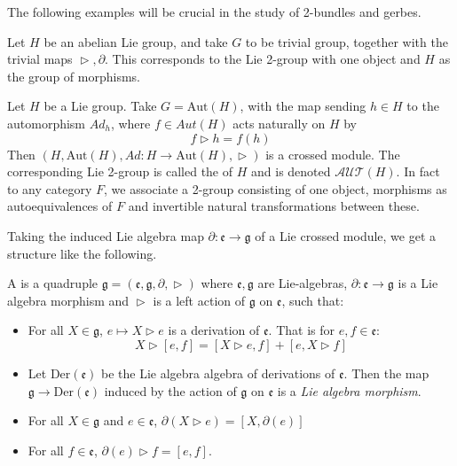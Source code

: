 The following examples will be crucial in the study of 2-bundles and gerbes.
\begin{example} \label{abgerb}
 Let $H$ be an abelian Lie group, and take $G$ to be trivial group, together with the trivial maps $\vartriangleright,\partial$. This corresponds to the Lie 2-group with one object and $H$ as the group of morphisms.
\end{example}
\begin{example} \label{nabgerb}
 Let $H$ be a Lie group. Take $G=\text{Aut}(H)$, with the map sending $h\in H$ to the automorphism $Ad_h$, where $f\in Aut(H)$ acts naturally on $H$ by 
\[ f \vartriangleright h = f(h) \]
Then $(H,\text{Aut}(H), Ad:H\rightarrow \text{Aut}(H),\vartriangleright)$ is a crossed module. The corresponding Lie 2-group is called the  of $H$ and is denoted $\mathcal{AUT}(H)$. In fact to any category $F$, we associate a 2-group  consisting of one object, morphisms as autoequivalences of $F$ and invertible natural transformations between these.
\end{example}


Taking the induced Lie algebra map $\partial:\mathfrak{e}\rightarrow\mathfrak{g}$ of a Lie crossed module, we get a structure like the following.

\begin{definition}
 A  is a quadruple $\mathfrak{g}=(\mathfrak{e},\mathfrak{g},\partial,\vartriangleright)$ where $\mathfrak{e},\mathfrak{g}$ are Lie-algebras, $\partial:\mathfrak{e}\rightarrow\mathfrak{g}$ is a Lie algebra morphism and $\vartriangleright$ is a left action of $\mathfrak{g}$ on $\mathfrak{e}$, such that:
\begin{itemize}
 \item For all $X\in\mathfrak{g}$, $e\mapsto X\vartriangleright e$ is a derivation of $\mathfrak{e}$. That is for $e,f\in \mathfrak{e}$:\[X\vartriangleright [e,f] = [X\vartriangleright e,f]+[e,X\vartriangleright f]\]
 \item Let $\text{Der}(\mathfrak{e})$ be the Lie algebra algebra of derivations of $\mathfrak{e}$.  Then the map $\mathfrak{g}\rightarrow \text{Der}(\mathfrak{e})$ induced by the action of $\mathfrak{g}$ on $\mathfrak{e}$ is a \emph{Lie algebra morphism}.
\item For all $X\in\mathfrak{g}$ and $e\in\mathfrak{e}$, $\partial(X\vartriangleright e)=[X,\partial(e)]$
\item For all $f\in \mathfrak{e}$, $\partial (e)\vartriangleright f=[e,f]$.
\end{itemize}
\end{definition}

